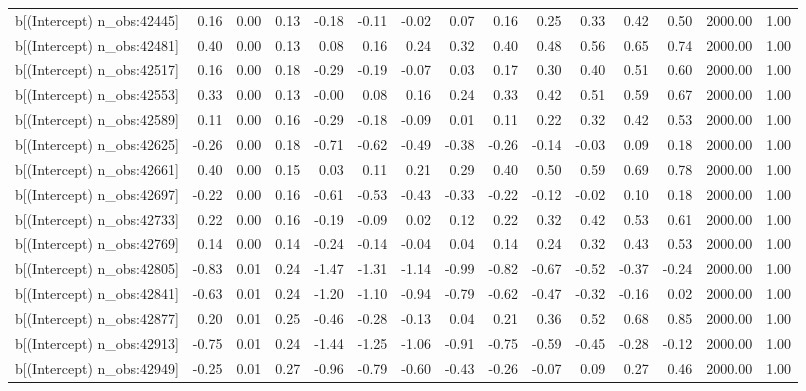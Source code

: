 \begin{table}[ht]
\begin{tabular}{rrrrrrrrrrrrrrr}
  b[(Intercept) n\_obs:42445] & 0.16 & 0.00 & 0.13 & -0.18 & -0.11 & -0.02 & 0.07 & 0.16 & 0.25 & 0.33 & 0.42 & 0.50 & 2000.00 & 1.00 \\ 
  b[(Intercept) n\_obs:42481] & 0.40 & 0.00 & 0.13 & 0.08 & 0.16 & 0.24 & 0.32 & 0.40 & 0.48 & 0.56 & 0.65 & 0.74 & 2000.00 & 1.00 \\ 
  b[(Intercept) n\_obs:42517] & 0.16 & 0.00 & 0.18 & -0.29 & -0.19 & -0.07 & 0.03 & 0.17 & 0.30 & 0.40 & 0.51 & 0.60 & 2000.00 & 1.00 \\ 
  b[(Intercept) n\_obs:42553] & 0.33 & 0.00 & 0.13 & -0.00 & 0.08 & 0.16 & 0.24 & 0.33 & 0.42 & 0.51 & 0.59 & 0.67 & 2000.00 & 1.00 \\ 
  b[(Intercept) n\_obs:42589] & 0.11 & 0.00 & 0.16 & -0.29 & -0.18 & -0.09 & 0.01 & 0.11 & 0.22 & 0.32 & 0.42 & 0.53 & 2000.00 & 1.00 \\ 
  b[(Intercept) n\_obs:42625] & -0.26 & 0.00 & 0.18 & -0.71 & -0.62 & -0.49 & -0.38 & -0.26 & -0.14 & -0.03 & 0.09 & 0.18 & 2000.00 & 1.00 \\ 
  b[(Intercept) n\_obs:42661] & 0.40 & 0.00 & 0.15 & 0.03 & 0.11 & 0.21 & 0.29 & 0.40 & 0.50 & 0.59 & 0.69 & 0.78 & 2000.00 & 1.00 \\ 
  b[(Intercept) n\_obs:42697] & -0.22 & 0.00 & 0.16 & -0.61 & -0.53 & -0.43 & -0.33 & -0.22 & -0.12 & -0.02 & 0.10 & 0.18 & 2000.00 & 1.00 \\ 
  b[(Intercept) n\_obs:42733] & 0.22 & 0.00 & 0.16 & -0.19 & -0.09 & 0.02 & 0.12 & 0.22 & 0.32 & 0.42 & 0.53 & 0.61 & 2000.00 & 1.00 \\ 
  b[(Intercept) n\_obs:42769] & 0.14 & 0.00 & 0.14 & -0.24 & -0.14 & -0.04 & 0.04 & 0.14 & 0.24 & 0.32 & 0.43 & 0.53 & 2000.00 & 1.00 \\ 
  b[(Intercept) n\_obs:42805] & -0.83 & 0.01 & 0.24 & -1.47 & -1.31 & -1.14 & -0.99 & -0.82 & -0.67 & -0.52 & -0.37 & -0.24 & 2000.00 & 1.00 \\ 
  b[(Intercept) n\_obs:42841] & -0.63 & 0.01 & 0.24 & -1.20 & -1.10 & -0.94 & -0.79 & -0.62 & -0.47 & -0.32 & -0.16 & 0.02 & 2000.00 & 1.00 \\ 
  b[(Intercept) n\_obs:42877] & 0.20 & 0.01 & 0.25 & -0.46 & -0.28 & -0.13 & 0.04 & 0.21 & 0.36 & 0.52 & 0.68 & 0.85 & 2000.00 & 1.00 \\ 
  b[(Intercept) n\_obs:42913] & -0.75 & 0.01 & 0.24 & -1.44 & -1.25 & -1.06 & -0.91 & -0.75 & -0.59 & -0.45 & -0.28 & -0.12 & 2000.00 & 1.00 \\ 
  b[(Intercept) n\_obs:42949] & -0.25 & 0.01 & 0.27 & -0.96 & -0.79 & -0.60 & -0.43 & -0.26 & -0.07 & 0.09 & 0.27 & 0.46 & 2000.00 & 1.00 \\ 

\end{tabular}
\end{table}

